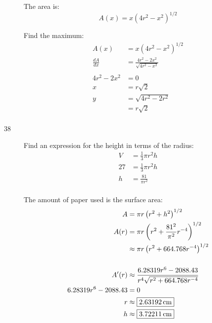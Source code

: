 \documentclass[letterpaper]{exam}
\begin{document}
\begin{description}
      The area is:
      \[
        A(x) = x (4r^2 - x^2)^{1/2}
      \]

      Find the maximum:
      \begin{align*}
        A(x)          & = x (4r^2 - x^2)^{1/2} \\
        \frac{dA}{dx} & = \frac{4r^2 - 2x^2}{\sqrt{4r^2 - x^2}} \\
        \\
        4r^2 - 2x^2 & = 0 \\
        x           & = r \sqrt{2} \\
        y           & = \sqrt{4r^2 - 2r^2} \\
                    & = r \sqrt{2} \\
      \end{align*}


    \newpage

    \item[38]
      Find an expression for the height in terms of the radius:
      \begin{align*}
        V  & = \frac{1}{3} \pi r^2 h \\
        27 & = \frac{1}{3} \pi r^2 h \\
        h  & = \frac{81}{\pi r^2} \\
      \end{align*}

      The amount of paper used is the surface area:
      \begin{align*}
        A                     & = \pi r \left( r^2 + h^2 \right)^{1/2} \\
        A(r)                  & = \pi r \left( r^2 + \frac{81^2}{\pi^2} r^{-4} \right)^{1/2} \\
                              & \approx \pi r \left( r^2 + 664.768 r^{-4} \right)^{1/2} \\
        \\
        A'(r)                 & \approx \frac{6.28319 r^6 - 2088.43}{r^4 \sqrt{r^2 + 664.768 r^{ - 4}}} \\
        6.28319 r^6 - 2088.43 & = 0 \\
        r                     & \approx \boxed{ \unit[2.63192]{cm} } \\
        h                     & \approx \boxed{ \unit[3.72211]{cm} } \\
      \end{align*}

  \end{description}
\end{document}
